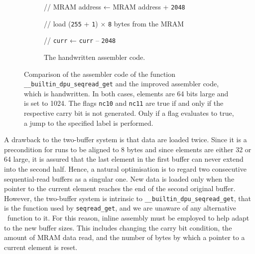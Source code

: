 \begin{figure}[t]
\begin{subfigure}{\textwidth}
\begin{minipage}{ \widthof{// \lstinline|curr| ← \lstinline|curr| + \lstinline|8|; jump if no 10th carry bit} }
			// \ac{MRAM} address ← \ac{MRAM} address + \lstinline|2048|

			// load (\lstinline|255| + \lstinline|1|) × \lstinline|8| bytes from the \ac{MRAM}

			// \lstinline|curr| ← \lstinline|curr| – \lstinline|2048|

			\phantom{lg}
		\end{minipage}

		\caption{
			The handwritten assembler code.
		}
		\label{fig:mram:assembler:manual}
	\end{subfigure}

	\caption{
		Comparison of the assembler code of the function \lstinline|__builtin_dpu_seqread_get| and the improved assembler code, which is handwritten.
		In both cases, elements are 64 bits large and \seqreadcachesize{} is set to 1024.
		The flags \lstinline|nc10| and \lstinline|nc11| are true if and only if the respective carry bit is not generated.
		Only if a flag evaluates to true, a jump to the specified label is performed.
	}
	\label{fig:mram:assembler}
\end{figure}

A drawback to the two-buffer system is that data are loaded twice.
Since it is a precondition for runs to be aligned to 8 bytes and since elements are either \qty{32}{\bits} or \qty{64}{\bits} large, it is assured that the last element in the first buffer can never extend into the second half.
Hence, a natural optimisation is to regard two consecutive sequential-read buffers as a singular one.
New data is loaded only when the pointer to the current element reaches the end of the second original buffer.
However, the two-buffer system is intrinsic to \lstinline|__builtin_dpu_seqread_get|, that is the function used by \lstinline|seqread_get|, and we are unaware of any alternative \langC{}~function to it.
For this reason, inline assembly must be employed to help adapt to the new buffer sizes.
This includes changing the carry bit condition, the amount of \ac{MRAM} data read, and the number of bytes by which a pointer to a current element is reset.

